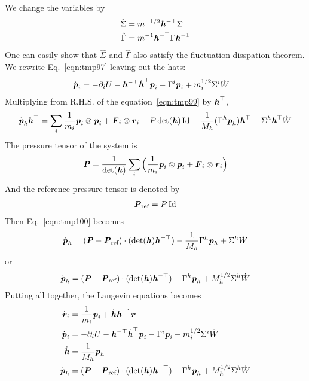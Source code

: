 \documentclass[aps, pre, preprint,unsortedaddress,a4paper,onecolumn]{revtex4}
\newcommand{\vect}[1]{\textbf{\textit{#1}}}
\newcommand{\id}{\mathrm{Id}}
\newcommand{\dvh}{\dot{\vect h}}
\newcommand{\dvr}{\dot{\vect r}}
\newcommand{\dvp}{\dot{\vect p}}
\newcommand{\inv}{{-1}}
\begin{document}
We change the variables by
\begin{align}
  \hat \Sigma &= m^{-1/2} \vect h^{-\top}\Sigma\\
  \hat \Gamma &= m^\inv \vect h^{-\top} \Gamma \vect h^\inv
\end{align}
One can easily show that $\hat \Sigma$ and $\hat \Gamma$ also satisfy the  fluctuation-disspation theorem. We rewrite Eq.~\eqref{eqn:tmp97} leaving out the hats:
\begin{align}
  \dvp_i & = - \partial_i U - \vect h^{-\top}\dvh^\top\vect p_i -   \Gamma^i \vect p_i + m_i^{1/2} \Sigma^i \dot W
\end{align}
Multiplying from R.H.S. of the equation~\eqref{eqn:tmp99} by $\vect h^\top$, 
\begin{align}\label{eqn:tmp100}
  \dot{\vect p}_h \vect h^\top
  = \sum_i\frac{1}{m_i} \vect p_i\otimes\vect p_i + \vect F_i \otimes \vect r_i 
  - P \det (\vect h)\, \id
  - \frac1{M_h} (\Gamma^h \vect p_h) \vect h^\top
  + \Sigma^h \vect h^\top \dot W 
\end{align}
The pressure tensor of the system is
\begin{align}
  \vect P = \frac1{\det(\vect h)} \sum_i \Big( \frac1{m_i}\vect p_i\otimes\vect p_i + \vect F_i\otimes \vect r_i \Big )
\end{align}
And the reference pressure tensor is denoted by
\begin{align}
  \vect P_{\textrm{ref}} = P\,\id
\end{align}
Then Eq.~\eqref{eqn:tmp100} becomes
\begin{align}
  \dot{\vect p}_h 
  =
 (\vect P - \vect P_{\textrm{ref}}) \cdot (\det (\vect h) \vect h^{-\top})
  - \frac1{M_h} \Gamma^h \vect p_h
  + \Sigma^h \dot W   
\end{align}
or
\begin{align}
  \dot{\vect p}_h 
  =
 (\vect P - \vect P_{\textrm{ref}}) \cdot (\det (\vect h) \vect h^{-\top})
  -  \Gamma^h \vect p_h
  + M^{1/2}_h\Sigma^h \dot W   
\end{align}
Putting all together, the Langevin equations becomes
\begin{align}
  \dvr_i &= \frac1{m_i}\vect p_i + \dvh\vect h^\inv\vect r \\
  \dvp_i & = - \partial_i U - \vect h^{-\top}\dvh^\top\vect p_i -   \Gamma^i \vect p_i + m_i^{1/2} \Sigma^i \dot W\\\label{eqn:tmp111}
  \dvh &= \frac1{M_h}{\vect p_h}\\ \label{eqn:tmp112}
  \dot{\vect p}_h 
         & =  (\vect P - \vect P_{\textrm{ref}}) \cdot (\det (\vect h) \vect h^{-\top})
           - \Gamma^h \vect p_h
           + M^{1/2}_h\Sigma^h \dot W   
\end{align}
\end{document}
